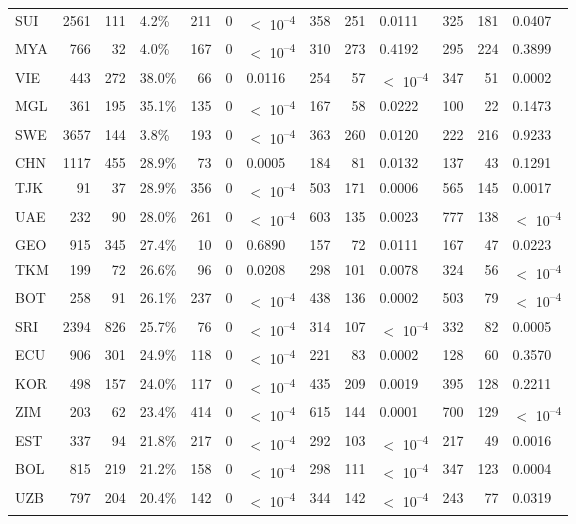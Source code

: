 \begin{tabular}[t]{lrrlrrlrrlrrl}
SUI & 2561 & 111 & 4.2\% & 211 & 0 & $<$ 10\textsuperscript{--4} & 358 & 251 & 0.0111 & 325 & 181 & 0.0407\\
MYA & 766 & 32 & 4.0\% & 167 & 0 & $<$ 10\textsuperscript{--4} & 310 & 273 & 0.4192 & 295 & 224 & 0.3899\\
VIE & 443 & 272 & 38.0\% & 66 & 0 & 0.0116 & 254 & 57 & $<$ 10\textsuperscript{--4} & 347 & 51 & 0.0002\\
MGL & 361 & 195 & 35.1\% & 135 & 0 & $<$ 10\textsuperscript{--4} & 167 & 58 & 0.0222 & 100 & 22 & 0.1473\\
SWE & 3657 & 144 & 3.8\% & 193 & 0 & $<$ 10\textsuperscript{--4} & 363 & 260 & 0.0120 & 222 & 216 & 0.9233\\
CHN & 1117 & 455 & 28.9\% & 73 & 0 & 0.0005 & 184 & 81 & 0.0132 & 137 & 43 & 0.1291\\
TJK & 91 & 37 & 28.9\% & 356 & 0 & $<$ 10\textsuperscript{--4} & 503 & 171 & 0.0006 & 565 & 145 & 0.0017\\
UAE & 232 & 90 & 28.0\% & 261 & 0 & $<$ 10\textsuperscript{--4} & 603 & 135 & 0.0023 & 777 & 138 & $<$ 10\textsuperscript{--4}\\
GEO & 915 & 345 & 27.4\% & 10 & 0 & 0.6890 & 157 & 72 & 0.0111 & 167 & 47 & 0.0223\\
TKM & 199 & 72 & 26.6\% & 96 & 0 & 0.0208 & 298 & 101 & 0.0078 & 324 & 56 & $<$ 10\textsuperscript{--4}\\
BOT & 258 & 91 & 26.1\% & 237 & 0 & $<$ 10\textsuperscript{--4} & 438 & 136 & 0.0002 & 503 & 79 & $<$ 10\textsuperscript{--4}\\
SRI & 2394 & 826 & 25.7\% & 76 & 0 & $<$ 10\textsuperscript{--4} & 314 & 107 & $<$ 10\textsuperscript{--4} & 332 & 82 & 0.0005\\
ECU & 906 & 301 & 24.9\% & 118 & 0 & $<$ 10\textsuperscript{--4} & 221 & 83 & 0.0002 & 128 & 60 & 0.3570\\
KOR & 498 & 157 & 24.0\% & 117 & 0 & $<$ 10\textsuperscript{--4} & 435 & 209 & 0.0019 & 395 & 128 & 0.2211\\
ZIM & 203 & 62 & 23.4\% & 414 & 0 & $<$ 10\textsuperscript{--4} & 615 & 144 & 0.0001 & 700 & 129 & $<$ 10\textsuperscript{--4}\\
EST & 337 & 94 & 21.8\% & 217 & 0 & $<$ 10\textsuperscript{--4} & 292 & 103 & $<$ 10\textsuperscript{--4} & 217 & 49 & 0.0016\\
BOL & 815 & 219 & 21.2\% & 158 & 0 & $<$ 10\textsuperscript{--4} & 298 & 111 & $<$ 10\textsuperscript{--4} & 347 & 123 & 0.0004\\
UZB & 797 & 204 & 20.4\% & 142 & 0 & $<$ 10\textsuperscript{--4} & 344 & 142 & $<$ 10\textsuperscript{--4} & 243 & 77 & 0.0319\\

\end{tabular}
